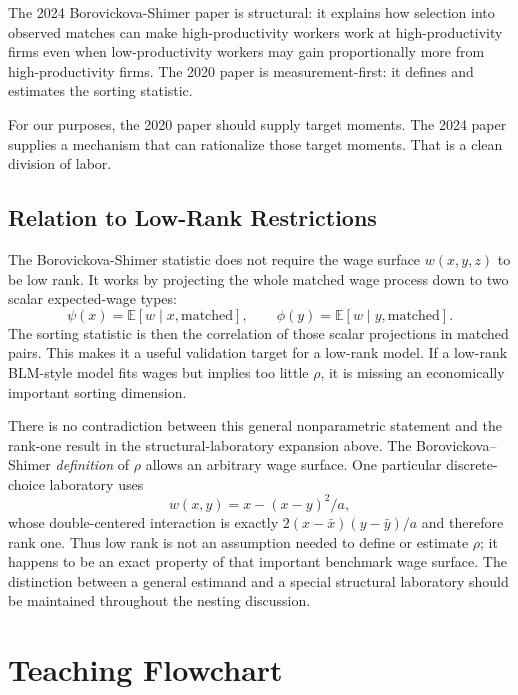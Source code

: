 \documentclass[11pt]{article}
\newcommand{\E}{\mathbb{E}}
\begin{document}
The 2024 Borovickova-Shimer paper is structural: it explains how selection into observed matches can make high-productivity workers work at high-productivity firms even when low-productivity workers may gain proportionally more from high-productivity firms. The 2020 paper is measurement-first: it defines and estimates the sorting statistic.

For our purposes, the 2020 paper should supply target moments. The 2024 paper supplies a mechanism that can rationalize those target moments. That is a clean division of labor.

\subsection{Relation to Low-Rank Restrictions}

The Borovickova-Shimer statistic does not require the wage surface $w(x,y,z)$ to be low rank. It works by projecting the whole matched wage process down to two scalar expected-wage types:
\[
  \psi(x)=\E[w\mid x,\text{matched}],
  \qquad
  \phi(y)=\E[w\mid y,\text{matched}].
\]
The sorting statistic is then the correlation of those scalar projections in matched pairs. This makes it a useful validation target for a low-rank model. If a low-rank BLM-style model fits wages but implies too little $\rho$, it is missing an economically important sorting dimension.

There is no contradiction between this general nonparametric statement and the
rank-one result in the structural-laboratory expansion above.  The
Borovickova--Shimer \emph{definition} of \(\rho\) allows an arbitrary wage
surface.  One particular discrete-choice laboratory uses
\[
w(x,y)=x-(x-y)^2/a,
\]
whose double-centered interaction is exactly
\(2(x-\bar x)(y-\bar y)/a\) and therefore rank one.  Thus low rank is not an
assumption needed to define or estimate \(\rho\); it happens to be an exact
property of that important benchmark wage surface.  The distinction between a
general estimand and a special structural laboratory should be maintained
throughout the nesting discussion.

\section{Teaching Flowchart}
\end{document}
